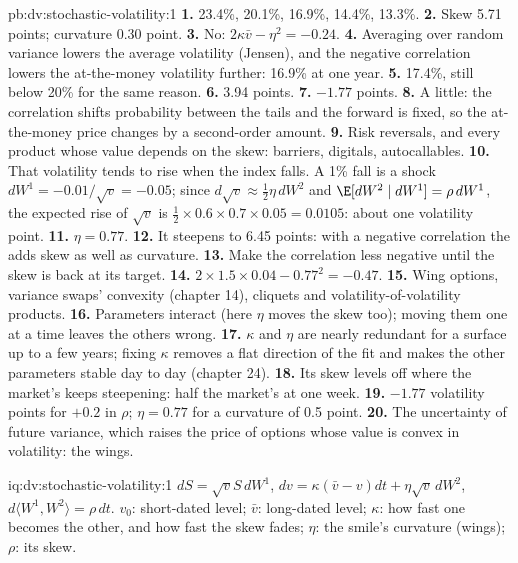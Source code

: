 \begin{solution}{pb:dv:stochastic-volatility:1}
\textbf{1.} 23.4\%, 20.1\%, 16.9\%, 14.4\%, 13.3\%.
\textbf{2.} Skew 5.71 points; curvature 0.30 point.
\textbf{3.} No: $2\kappa\bar v-\eta^2=-0.24$.
\textbf{4.} Averaging over random variance lowers the average volatility (Jensen), and the negative correlation
lowers the at-the-money volatility further: 16.9\% at one year.
\textbf{5.} 17.4\%, still below 20\% for the same reason.
\textbf{6.} 3.94 points.
\textbf{7.} $-1.77$ points.
\textbf{8.} A little: the correlation shifts probability between the tails and the forward is fixed, so the
at-the-money price changes by a second-order amount.
\textbf{9.} Risk reversals, and every product whose value depends on the skew: barriers, digitals, autocallables.
\textbf{10.} That volatility tends to rise when the index falls. A 1\% fall is a shock
$dW^1=-0.01/\sqrt{v}=-0.05$; since $d\sqrt v\approx\tfrac12\eta\,dW^2$ and $\E[dW^2\mid dW^1]=\rho\,dW^1$, the
expected rise of $\sqrt v$ is $\tfrac12\times0.6\times0.7\times0.05=0.0105$: about one volatility point.
\textbf{11.} $\eta=0.77$.
\textbf{12.} It steepens to 6.45 points: with a negative correlation the  adds skew as well
as curvature.
\textbf{13.} Make the correlation less negative until the skew is back at its target.
\textbf{14.} $2\times1.5\times0.04-0.77^2=-0.47$.
\textbf{15.} Wing options, variance swaps' convexity (chapter 14), cliquets and volatility-of-volatility products.
\textbf{16.} Parameters interact (here $\eta$ moves the skew too); moving them one at a time leaves the others
wrong.
\textbf{17.} $\kappa$ and $\eta$ are nearly redundant for a surface up to a few years; fixing $\kappa$ removes a flat
direction of the fit and makes the other parameters stable day to day (chapter 24).
\textbf{18.} Its skew levels off where the market's keeps steepening: half the market's at one week.
\textbf{19.} $-1.77$ volatility points for $+0.2$ in $\rho$; $\eta=0.77$ for a curvature of 0.5 point.
\textbf{20.} The uncertainty of future variance, which raises the price of options whose value is convex in
volatility: the wings.
\end{solution}

\begin{solution}{iq:dv:stochastic-volatility:1}
$dS=\sqrt vS\,dW^1$, $dv=\kappa(\bar v-v)dt+\eta\sqrt v\,dW^2$, $d\langle W^1,W^2\rangle=\rho\,dt$. $v_0$: short-dated
level; $\bar v$: long-dated level; $\kappa$: how fast one becomes the other, and how fast the skew fades; $\eta$: the
smile's curvature (wings); $\rho$: its skew.
\end{solution}

